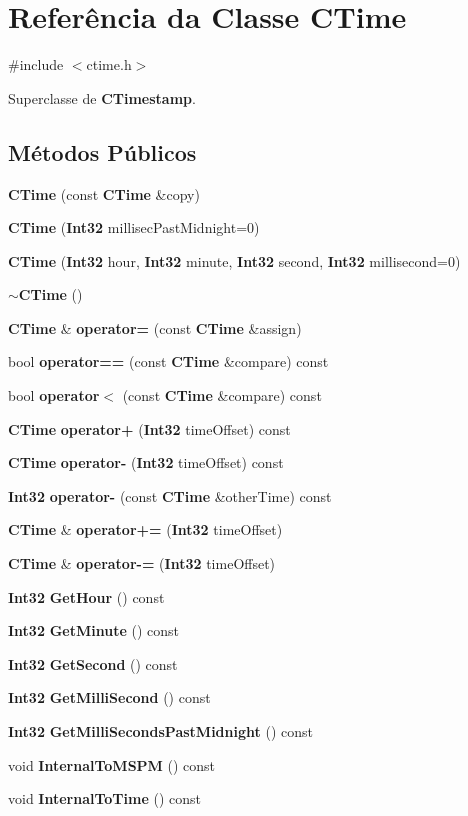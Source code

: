 \section{Referência da Classe C\+Time}
\label{class_c_time}


{\ttfamily \#include $<$ctime.\+h$>$}



Superclasse de {\bf C\+Timestamp}.

\subsection*{Métodos Públicos}
\begin{DoxyCompactItemize}
\item 
{\bf C\+Time} (const {\bf C\+Time} \&copy)
\item 
{\bf C\+Time} ({\bf Int32} millisec\+Past\+Midnight=0)
\item 
{\bf C\+Time} ({\bf Int32} hour, {\bf Int32} minute, {\bf Int32} second, {\bf Int32} millisecond=0)
\item 
{\bf $\sim$\+C\+Time} ()
\item 
{\bf C\+Time} \& {\bf operator=} (const {\bf C\+Time} \&assign)
\item 
bool {\bf operator==} (const {\bf C\+Time} \&compare) const 
\item 
bool {\bf operator$<$} (const {\bf C\+Time} \&compare) const 
\item 
{\bf C\+Time} {\bf operator+} ({\bf Int32} time\+Offset) const 
\item 
{\bf C\+Time} {\bf operator-\/} ({\bf Int32} time\+Offset) const 
\item 
{\bf Int32} {\bf operator-\/} (const {\bf C\+Time} \&other\+Time) const 
\item 
{\bf C\+Time} \& {\bf operator+=} ({\bf Int32} time\+Offset)
\item 
{\bf C\+Time} \& {\bf operator-\/=} ({\bf Int32} time\+Offset)
\item 
{\bf Int32} {\bf Get\+Hour} () const 
\item 
{\bf Int32} {\bf Get\+Minute} () const 
\item 
{\bf Int32} {\bf Get\+Second} () const 
\item 
{\bf Int32} {\bf Get\+Milli\+Second} () const 
\item 
{\bf Int32} {\bf Get\+Milli\+Seconds\+Past\+Midnight} () const 
\item 
void {\bf Internal\+To\+M\+S\+PM} () const 
\item 
void {\bf Internal\+To\+Time} () const 
\end{DoxyCompactItemize}
